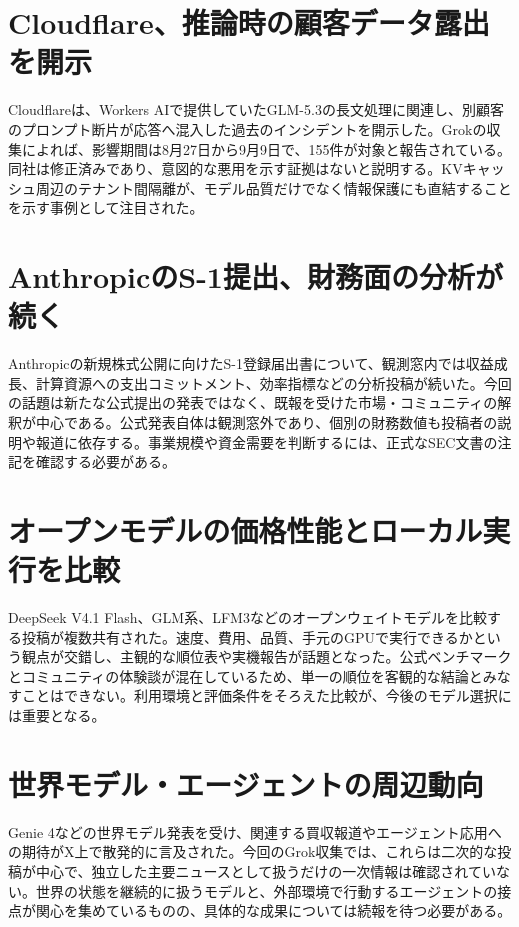 \section{Cloudflare、推論時の顧客データ露出を開示}
Cloudflareは、Workers AIで提供していたGLM-5.3の長文処理に関連し、別顧客のプロンプト断片が応答へ混入した過去のインシデントを開示した。Grokの収集によれば、影響期間は8月27日から9月9日で、155件が対象と報告されている。同社は修正済みであり、意図的な悪用を示す証拠はないと説明する。KVキャッシュ周辺のテナント間隔離が、モデル品質だけでなく情報保護にも直結することを示す事例として注目された。

\section{AnthropicのS-1提出、財務面の分析が続く}
Anthropicの新規株式公開に向けたS-1登録届出書について、観測窓内では収益成長、計算資源への支出コミットメント、効率指標などの分析投稿が続いた。今回の話題は新たな公式提出の発表ではなく、既報を受けた市場・コミュニティの解釈が中心である。公式発表自体は観測窓外であり、個別の財務数値も投稿者の説明や報道に依存する。事業規模や資金需要を判断するには、正式なSEC文書の注記を確認する必要がある。

\section{オープンモデルの価格性能とローカル実行を比較}
DeepSeek V4.1 Flash、GLM系、LFM3などのオープンウェイトモデルを比較する投稿が複数共有された。速度、費用、品質、手元のGPUで実行できるかという観点が交錯し、主観的な順位表や実機報告が話題となった。公式ベンチマークとコミュニティの体験談が混在しているため、単一の順位を客観的な結論とみなすことはできない。利用環境と評価条件をそろえた比較が、今後のモデル選択には重要となる。

\section{世界モデル・エージェントの周辺動向}
Genie 4などの世界モデル発表を受け、関連する買収報道やエージェント応用への期待がX上で散発的に言及された。今回のGrok収集では、これらは二次的な投稿が中心で、独立した主要ニュースとして扱うだけの一次情報は確認されていない。世界の状態を継続的に扱うモデルと、外部環境で行動するエージェントの接点が関心を集めているものの、具体的な成果については続報を待つ必要がある。
